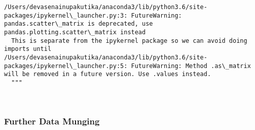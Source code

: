 \documentclass[11pt]{article}
\begin{document}
    \begin{Verbatim}[commandchars=\\\{\}]
/Users/devasenainupakutika/anaconda3/lib/python3.6/site-packages/ipykernel\_launcher.py:3: FutureWarning: pandas.scatter\_matrix is deprecated, use pandas.plotting.scatter\_matrix instead
  This is separate from the ipykernel package so we can avoid doing imports until
/Users/devasenainupakutika/anaconda3/lib/python3.6/site-packages/ipykernel\_launcher.py:5: FutureWarning: Method .as\_matrix will be removed in a future version. Use .values instead.
  """

    \end{Verbatim}

    \begin{center}
    \end{center}
    { \hspace*{\fill} \\}
    
    \subsubsection{Further Data Munging}\label{further-data-munging}
\end{document}

